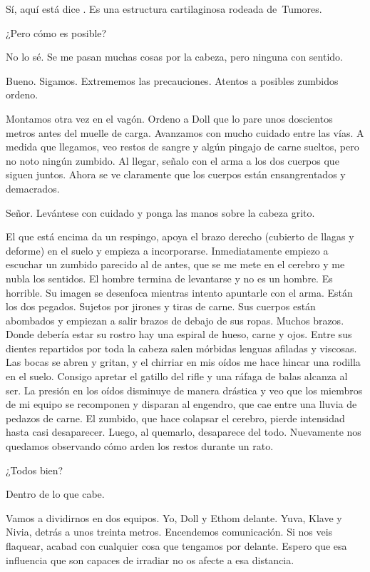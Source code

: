 \reply Sí, aquí está \pause dice \pauseend. Es una estructura cartilaginosa rodeada de\textellipsis\ Tumores.

\reply ¿Pero cómo es posible? \klave

\reply No lo sé. Se me pasan muchas cosas por la cabeza, pero ninguna con sentido.

\reply Bueno. Sigamos. Extrememos las precauciones. Atentos a posibles zumbidos \pause ordeno.

Montamos otra vez en el vagón. Ordeno a Doll que lo pare unos doscientos metros antes del muelle de carga. Avanzamos con mucho cuidado entre las vías. A medida que llegamos, veo restos de sangre y algún pingajo de carne sueltos, pero no noto ningún zumbido.
Al llegar, señalo con el arma a los dos cuerpos que siguen juntos. Ahora se ve claramente que los cuerpos están ensangrentados y demacrados.

\reply Señor. Levántese con cuidado y ponga las manos sobre la ca\-be\-za \pause gri\-to.

El que está encima da un respingo, apoya el brazo derecho (cubierto de llagas y deforme) en el suelo y empieza a incorporarse. Inmediatamente empiezo a escuchar un zumbido parecido al de antes, que se me mete en el cerebro y me nubla los sentidos. El hombre termina de levantarse y no es un hombre. Es horrible. Su imagen se desenfoca mientras intento apuntarle con el arma. Están los dos pegados. Sujetos por jirones y tiras de carne. Sus cuerpos están abombados y empiezan a salir brazos de debajo de sus ropas. Muchos brazos. Donde debería estar su rostro hay una espiral de hueso, carne y ojos. Entre sus dientes repartidos por toda la cabeza salen mórbidas lenguas afiladas y viscosas. Las bocas se abren y gritan, y el chirriar en mis oídos me hace hincar una rodilla en el suelo. Consigo apretar el gatillo del rifle y una ráfaga de balas alcanza al ser. La presión en los oídos disminuye de manera drástica y veo que los miembros de mi equipo se recomponen y disparan al engendro, que cae entre una lluvia de pedazos de carne. El zumbido, que hace colapsar el cerebro, pierde intensidad hasta casi desaparecer. Luego, al quemarlo, desaparece del todo. Nuevamente nos quedamos observando cómo arden los restos durante un rato.

\reply ¿Todos bien?

\reply Dentro de lo que cabe.

\reply Vamos a dividirnos en dos equipos. Yo, Doll y Ethom delante. Yuva, Klave y Nivia, detrás a unos treinta metros. Encendemos comunicación. Si nos veis flaquear, acabad con cualquier cosa que tengamos por delante. Espero que esa influencia que son capaces de irradiar no os afecte a esa distancia.

